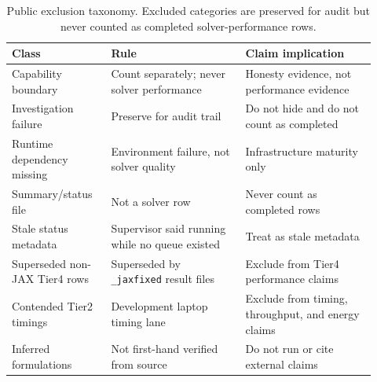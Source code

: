 \documentclass[11pt]{article}
\begin{document}
\begin{table}[tbp]
\centering
\caption{Public exclusion taxonomy. Excluded categories are preserved for audit but never counted as completed solver-performance rows.}
\label{tab:exclusions}
\footnotesize
\begin{tabular}{@{}L{0.25\linewidth}L{0.34\linewidth}L{0.33\linewidth}@{}}
\toprule
Class & Rule & Claim implication \\
\midrule
Capability boundary & Count separately; never solver performance & Honesty evidence, not performance evidence \\
Investigation failure & Preserve for audit trail & Do not hide and do not count as completed \\
Runtime dependency missing & Environment failure, not solver quality & Infrastructure maturity only \\
Summary/status file & Not a solver row & Never count as completed rows \\
Stale status metadata & Supervisor said running while no queue existed & Treat as stale metadata \\
Superseded non-JAX Tier4 rows & Superseded by \texttt{\_jaxfixed} result files & Exclude from Tier4 performance claims \\
Contended Tier2 timings & Development laptop timing lane & Exclude from timing, throughput, and energy claims \\
Inferred formulations & Not first-hand verified from source & Do not run or cite external claims \\
\bottomrule
\end{tabular}
\end{table}

\clearpage
\end{document}
